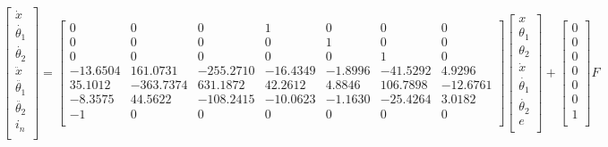 \documentclass[a4paper, 10pt]{report}
\begin{document}
\begin{equation*}
\begin{bmatrix}
\dot{x} \\
\dot{\theta_{1}}\\
\dot{\theta_{2}}\\
\ddot{x}\\
\ddot{\theta_{1}}\\
\ddot{\theta_{2}}\\
i_{n}\\
\end{bmatrix}
=
\begin{bmatrix}
0 & 0 & 0 & 1 & 0 & 0 & 0\\
0 & 0 & 0 & 0 & 1 & 0 & 0\\
0 & 0 & 0 & 0 & 0 & 1 & 0\\
-13.6504 & 161.0731 & -255.2710 & -16.4349 & -1.8996 & -41.5292 & 4.9296\\
35.1012 & -363.7374 & 631.1872 & 42.2612 & 4.8846 & 106.7898 & -12.6761\\
-8.3575 & 44.5622 & -108.2415 & -10.0623 & -1.1630 & -25.4264 & 3.0182\\
-1 & 0 & 0 & 0 & 0 & 0 & 0\\
\end{bmatrix}
\begin{bmatrix}
x \\
\theta_{1}\\
\theta_{2}\\
\dot{x}\\
\dot{\theta_{1}}\\
\dot{\theta_{2}}\\
e\\
\end{bmatrix}
+
\begin{bmatrix}
0\\
0\\
0\\
0\\
0\\
0\\
1\\
\end{bmatrix}
F
\end{equation*}
\end{document}
